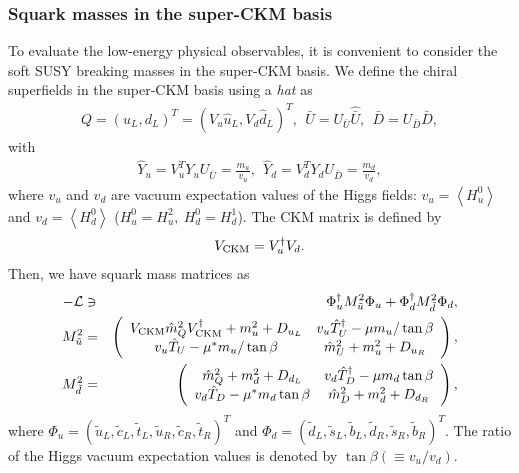 \documentclass[preprint,3p,12pt]{elsarticle}
\begin{document}
\subsubsection{Squark masses in the super-CKM basis}
To evaluate the low-energy physical observables, it is convenient to consider the soft SUSY breaking masses in the super-CKM basis. We define the chiral superfields in the super-CKM basis using a {\it hat} as
\begin{eqnarray}
Q = (u_L, d_L)^T= (V_u \hat u_L, V_d \hat d_L)^T,  \ \  \bar U = U_{\bar U} \hat{\bar U}, \ \ \bar D = U_{\bar D} \hat {\bar D},
\end{eqnarray}
with
\begin{eqnarray}
\hat Y_u = V_u^T Y_u U_{\bar U} = \frac{m_u}{v_u}, \ \ 
\hat Y_d = V_d^T Y_d U_{\bar D} = \frac{m_d}{v_d},
\end{eqnarray}
where $v_u$ and $v_d$ are vacuum expectation values of the Higgs fields: $v_u = \left<H_u^0\right>$ and $v_d = \left<H_d^0\right>$ ($H_u^0 = H_u^2, \ H_d^0 = H_d^1$). The CKM matrix is defined by 
\begin{eqnarray}
V_{\rm CKM} = V_u^\dag V_d.
\end{eqnarray}
Then, we have squark mass matrices as
\begin{eqnarray}
-\mathcal{L} &\ni& \Phi_u^\dag  M_{\tilde u}^2 \Phi_u + \Phi_d^\dag  M_{\tilde d}^2 \Phi_d, \nonumber \\
M_{\tilde u}^2 &=& 
\left(
\begin{array}{cc}
V_{\rm CKM} \hat m_Q^2 V_{\rm CKM}^\dag + m_u^2 + D_{u_L}&    v_u \hat T_U^\dag - \mu m_u /\tan\beta  \\
v_u \hat T_U  - \mu^* m_u /\tan\beta&    \hat m_{U}^2 + m_u^2 + D_{u_R}\\
\end{array}
\right),
\nonumber \\  
M_{\tilde d}^2 &=& 
\left(
\begin{array}{cc}
\hat m_Q^2  + m_d^2 + D_{d_L} &   v_d \hat T_D^\dag - \mu m_d \tan\beta  \\
 v_d \hat T_D - \mu^* m_d \tan\beta  &    \hat m_{D}^2 + m_d^2 + D_{d_R} \\
\end{array}
\right),
\end{eqnarray}
where $\Phi_u = \left( \tilde u_L, \tilde c_L,  \tilde t_L,  \tilde u_R, \tilde c_R,  \tilde t_R
\right)^T$ and 
$\Phi_d = \left( \tilde d_L,  \tilde s_L,  \tilde b_L,
\tilde d_R,  \tilde s_R,  \tilde b_R
 \right)^T$. The ratio of the Higgs vacuum expectation values is denoted by $\tan\beta ( \equiv v_u/v_d)$. 
\end{document}
